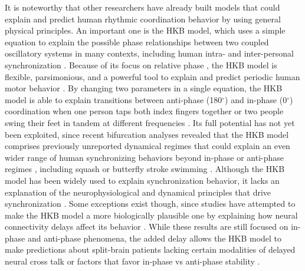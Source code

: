 \documentclass{report}
\begin{document}
It is noteworthy that other researchers have already built models that could explain and predict human rhythmic coordination behavior by using general physical principles. An important one is the HKB model, which uses a simple equation to explain the possible phase relationships between two coupled oscillatory systems in many contexts, including human intra- and inter-personal synchronization \cite{slowinski2016effects}. Because of its focus on relative phase \cite{calvin2010perspectives}, the HKB model is flexible, parsimonious, and a powerful tool to explain and predict periodic human motor behavior \cite{schmidt1990phase}. By changing two parameters in a single equation, the HKB model is able to explain transitions between anti-phase (180$^\circ$) and in-phase (0$^\circ$) coordination when one person taps both index fingers together or two people swing their feet in tandem at different frequencies \cite{schmidt1990phase}. Its full potential has not yet been exploited, since recent bifurcation analyses revealed that the HKB model comprises previously unreported dynamical regimes that could explain an even wider range of human synchronizing behaviors beyond in-phase or anti-phase regimes \cite{avitabile2016beyond}, including squash \cite{mcgarry2006identifying} or butterfly stroke swimming \cite{ehrlacher2003sports}. Although the HKB model has been widely used to explain synchronization behavior, it lacks an explanation of the neurophysiological and dynamical principles that drive synchronization \cite{peper2004explanatory}. Some exceptions exist though, since studies have attempted to make the HKB model a more biologically plausible one by explaining how neural connectivity delays affect its behavior \cite{banerjee2007neural, slowinski2016effects}. While these results are still focused on in-phase and anti-phase phenomena, the added delay allows the HKB model to make predictions about split-brain patients lacking certain modalities of delayed neural cross talk \cite{banerjee2007neural} or factors that favor in-phase vs anti-phase stability \cite{slowinski2016effects}.
\end{document}
